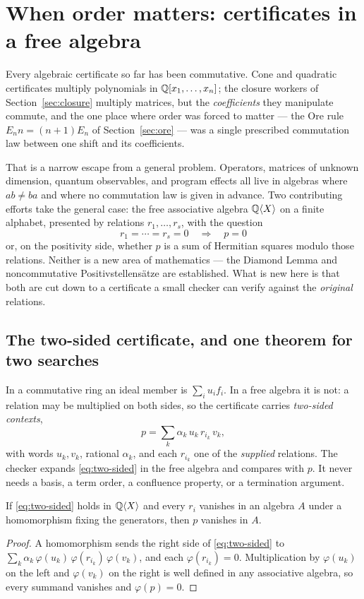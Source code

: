 \section{When order matters: certificates in a free algebra}
\label{sec:noncommutative}

Every algebraic certificate so far has been commutative. Cone and quadratic
certificates multiply polynomials in $\mathbb{Q}[x_1,\ldots,x_n]$; the closure workers of
Section~\ref{sec:closure} multiply matrices, but the \emph{coefficients} they
manipulate commute, and the one place where order was forced to matter --- the
Ore rule $E_n n=(n+1)E_n$ of Section~\ref{sec:ore} --- was a single prescribed
commutation law between one shift and its coefficients.

That is a narrow escape from a general problem. Operators, matrices of unknown
dimension, quantum observables, and program effects all live in algebras where
$ab\ne ba$ and where no commutation law is given in advance. Two contributing
efforts take the general case: the free associative algebra $\mathbb{Q}\langle
X\rangle$ on a finite alphabet, presented by relations $r_1,\ldots,r_s$, with
the question
\[
 r_1=\cdots=r_s=0 \quad\Longrightarrow\quad p=0
\]
or, on the positivity side, whether $p$ is a sum of Hermitian squares modulo
those relations. Neither is a new area of mathematics --- the Diamond Lemma and
noncommutative Positivstellens\"atze are established. What is new here is that
both are cut down to a certificate a small checker can verify against the
\emph{original} relations.

\subsection{The two-sided certificate, and one theorem for two searches}

In a commutative ring an ideal member is $\sum_i u_i f_i$. In a free algebra it
is not: a relation may be multiplied on both sides, so the certificate carries
\emph{two-sided contexts},
\begin{equation}\label{eq:two-sided}
 p=\sum_{k} \alpha_k\, u_k\, r_{i_k}\, v_k,
\end{equation}
with words $u_k,v_k$, rational $\alpha_k$, and each $r_{i_k}$ one of the
\emph{supplied} relations. The checker expands \eqref{eq:two-sided} in the free
algebra and compares with $p$. It never needs a basis, a term order, a
confluence property, or a termination argument.

\begin{theorem}\label{thm:nc-sound}
If \eqref{eq:two-sided} holds in $\mathbb{Q}\langle X\rangle$ and every $r_i$ vanishes
in an algebra $A$ under a homomorphism fixing the generators, then $p$ vanishes
in $A$.
\end{theorem}
\begin{proof}
A homomorphism sends the right side of \eqref{eq:two-sided} to
$\sum_k\alpha_k\,\varphi(u_k)\,\varphi(r_{i_k})\,\varphi(v_k)$, and each
$\varphi(r_{i_k})=0$. Multiplication by $\varphi(u_k)$ on the left and
$\varphi(v_k)$ on the right is well defined in any associative algebra, so
every summand vanishes and $\varphi(p)=0$.
\end{proof}

